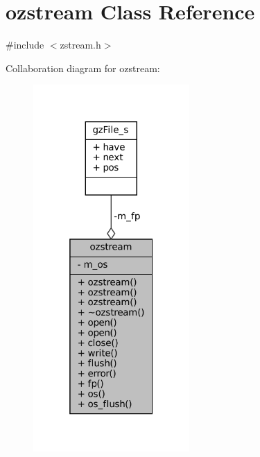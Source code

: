 \hypertarget{classozstream}{}\section{ozstream Class Reference}
\label{classozstream}


{\ttfamily \#include $<$zstream.\+h$>$}



Collaboration diagram for ozstream\+:
\nopagebreak
\begin{figure}[H]
\begin{center}
\leavevmode
\includegraphics[width=169pt]{classozstream__coll__graph}
\end{center}
\end{figure}
